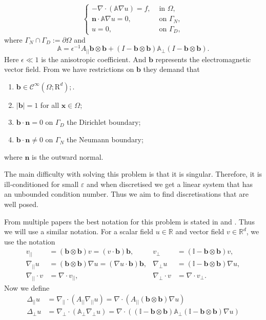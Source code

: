 \documentclass[12pt]{ociamthesis}
\begin{document}
\begin{equation} \label{PDE}
\begin{cases}
-\nabla \cdot (\mathbb{A}\nabla u) = f, & \text{ in }\Omega,\\
\mathbf{n}\cdot \mathbb{A}\nabla u = 0, & \text{ on }\Gamma_N, \\
u = 0, & \text{  on }\Gamma_D,
\end{cases}
\end{equation}
where $\Gamma_N \cap \Gamma_D := \partial \Omega$ and
\begin{equation} \label{Mat_A}
\mathbb{A} = \epsilon^{-1} A_{||}\mathbf{b}\otimes \mathbf{b}
+(I - \mathbf{b}\otimes \mathbf{b})\mathbb{A}_{\perp}
(I - \mathbf{b}\otimes \mathbf{b}).
\end{equation}
    Here $\epsilon \ll 1$ is the anisotropic coefficient. And $\mathbf{b}$ represents the electromagnetic vector field. From \cite{DN} we have restrictions on $\mathbf{b}$ they demand that
    \begin{enumerate}
  \item $\mathbf{b} \in \mathcal{C}^{\infty}(\Omega; \mathrm{R}^d);$.
  \item $|\mathbf{b}|=1$ for all $\mathbf{x} \in \Omega$;
  \item $\mathbf{b}\cdot \mathbf{n} = 0$ on $\Gamma_D$ the Dirichlet boundary;
  \item $\mathbf{b}\cdot \mathbf{n} \neq 0$ on $\Gamma_N$ the Neumann boundary;
\end{enumerate}
where $\mathbf{n}$ is the outward normal.

The main difficulty with solving this problem is that it is singular. Therefore, it is ill-conditioned for small $\varepsilon$ and when discretised we get a linear system that has an unbounded condition number. Thus we aim to find discretisations that are well posed.  

From multiple papers the best notation for this problem is stated in \cite{DN} and \cite{AP}. Thus we will use a similar notation. For a scalar field $u\in\mathbb{R}$ and vector field $v \in \mathbb{R}^d$, we use the notation
\begin{align}
v_{||} &=(\mathbf{b} \otimes \mathbf{b})v = (v \cdot \mathbf{b})\mathbf{b}
, & v_{\perp} &= (\mathbb{I}-\mathbf{b} \otimes \mathbf{b})v,\\
\nabla_{||}u &= (\mathbf{b} \otimes \mathbf{b}) \nabla u = (\nabla u \cdot \mathbf{b})\mathbf{b},
& \nabla_{\perp} u &= (\mathbb{I}-\mathbf{b} \otimes \mathbf{b}) \nabla u,\\
\nabla_{||} \cdot v &= \nabla \cdot v_{||},
& \nabla_{\perp} \cdot v &= \nabla \cdot v_{\perp}.
\end{align}
Now we define 
\begin{align} \label{Lap_para}
\Delta_{||}u &= \nabla_{||}\cdot(A_{||}\nabla_{||}u)  =
\nabla \cdot(A_{||} (\mathbf{b} \otimes \mathbf{b}) \nabla u)\\ \label{Lap_perp}
\Delta_{\perp}u  &= \nabla_{\perp}\cdot(\mathbb{A}_{\perp}\nabla_{\perp}u)  = 
\nabla \cdot((\mathbb{I}-\mathbf{b} \otimes \mathbf{b})\mathbb{A}_{\perp}(\mathbb{I}-\mathbf{b} \otimes \mathbf{b})\nabla u)
\end{align}
\end{document}

